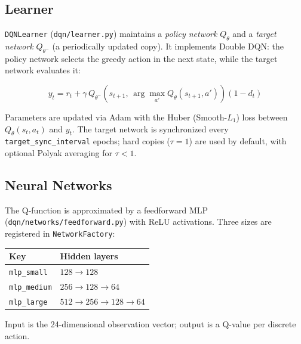 \subsection{Learner}
\texttt{DQNLearner} (\texttt{dqn/learner.py}) maintains a \emph{policy network} $Q_\theta$ and a \emph{target network} $Q_{\theta^-}$ (a periodically updated copy). It implements Double DQN: the policy network selects the greedy action in the next state, while the target network evaluates it:

\begin{equation}
    y_t = r_t + \gamma \, Q_{\theta^-}\!\left(s_{t+1},\, \arg\max_{a'} Q_\theta(s_{t+1}, a')\right)(1 - d_t)
\end{equation}

Parameters are updated via Adam with the Huber (Smooth-$L_1$) loss between $Q_\theta(s_t, a_t)$ and $y_t$. The target network is synchronized every \newline \texttt{target\_sync\_interval} epochs; hard copies ($\tau = 1$) are used by default, with optional Polyak averaging for $\tau < 1$.

\subsection{Neural Networks}
The Q-function is approximated by a feedforward MLP (\texttt{dqn/networks/feedforward.py}) with ReLU activations. Three sizes are registered in \newline \texttt{NetworkFactory}:

\begin{center}
\begin{tabular}{ll}
\hline
\textbf{Key} & \textbf{Hidden layers} \\
\hline
\texttt{mlp\_small}  & $128 \to 128$ \\
\texttt{mlp\_medium} & $256 \to 128 \to 64$ \\
\texttt{mlp\_large}  & $512 \to 256 \to 128 \to 64$ \\
\hline
\end{tabular}
\end{center}

Input is the 24-dimensional observation vector; output is a Q-value per discrete action.

